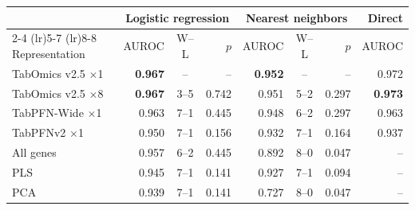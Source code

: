 \begin{tabular}{lrcrrcrr}
\toprule
 & \multicolumn{3}{c}{Logistic regression} & \multicolumn{3}{c}{Nearest neighbors} & Direct \\
\cmidrule(lr){2-4} \cmidrule(lr){5-7} \cmidrule(lr){8-8}
Representation & AUROC & W--L & $p$ & AUROC & W--L & $p$ & AUROC \\
\midrule
TabOmics v2.5 $\times$1 & \textbf{0.967} & -- & -- & \textbf{0.952} & -- & -- & 0.972 \\
TabOmics v2.5 $\times$8 & \textbf{0.967} & 3--5 & 0.742 & 0.951 & 5--2 & 0.297 & \textbf{0.973} \\
TabPFN-Wide $\times$1 & 0.963 & 7--1 & 0.445 & 0.948 & 6--2 & 0.297 & 0.963 \\
TabPFNv2 $\times$1 & 0.950 & 7--1 & 0.156 & 0.932 & 7--1 & 0.164 & 0.937 \\
All genes & 0.957 & 6--2 & 0.445 & 0.892 & 8--0 & 0.047 & -- \\
PLS & 0.945 & 7--1 & 0.141 & 0.927 & 7--1 & 0.094 & -- \\
PCA & 0.939 & 7--1 & 0.141 & 0.727 & 8--0 & 0.047 & -- \\
\bottomrule
\end{tabular}
